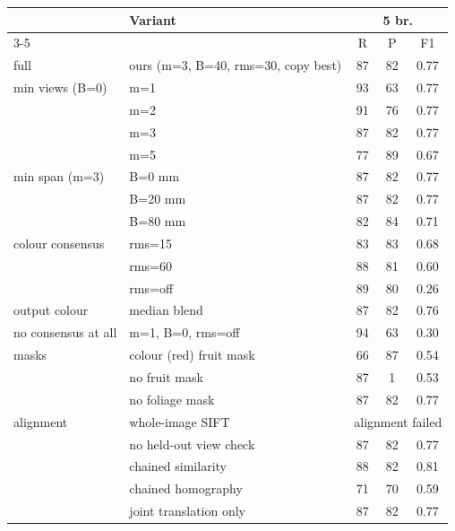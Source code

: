 \begin{tabular}{@{}llccc@{}}
\toprule
& Variant & \multicolumn{3}{c}{5 br.}\\
\cmidrule(lr){3-5}
& & R & P & F1\\
\midrule
full & ours (m=3, B=40, rms=30, copy best) & 87 & 82 & 0.77\\
\addlinespace[2pt]
min views (B=0) & m=1 & 93 & 63 & 0.77\\
 & m=2 & 91 & 76 & 0.77\\
 & m=3 & 87 & 82 & 0.77\\
 & m=5 & 77 & 89 & 0.67\\
\addlinespace[2pt]
min span (m=3) & B=0 mm & 87 & 82 & 0.77\\
 & B=20 mm & 87 & 82 & 0.77\\
 & B=80 mm & 82 & 84 & 0.71\\
\addlinespace[2pt]
colour consensus & rms=15 & 83 & 83 & 0.68\\
 & rms=60 & 88 & 81 & 0.60\\
 & rms=off & 89 & 80 & 0.26\\
\addlinespace[2pt]
output colour & median blend & 87 & 82 & 0.76\\
\addlinespace[2pt]
no consensus at all & m=1, B=0, rms=off & 94 & 63 & 0.30\\
\addlinespace[2pt]
masks & colour (red) fruit mask & 66 & 87 & 0.54\\
 & no fruit mask & 87 & 1 & 0.53\\
 & no foliage mask & 87 & 82 & 0.77\\
\addlinespace[2pt]
alignment & whole-image SIFT & \multicolumn{3}{c}{alignment failed}\\
 & no held-out view check & 87 & 82 & 0.77\\
 & chained similarity & 88 & 82 & 0.81\\
 & chained homography & 71 & 70 & 0.59\\
 & joint translation only & 87 & 82 & 0.77\\
\bottomrule
\end{tabular}
